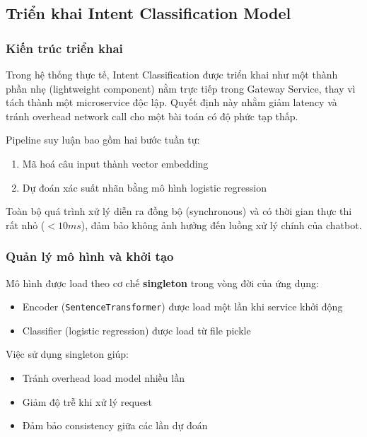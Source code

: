 \subsection{Triển khai Intent Classification Model}

\subsubsection{Kiến trúc triển khai}

Trong hệ thống thực tế, Intent Classification được triển khai như một thành phần nhẹ (lightweight component) nằm trực tiếp trong Gateway Service, thay vì tách thành một microservice độc lập. Quyết định này nhằm giảm latency và tránh overhead network call cho một bài toán có độ phức tạp thấp.

Pipeline suy luận bao gồm hai bước tuần tự:

\begin{enumerate}
    \item Mã hoá câu input thành vector embedding
    \item Dự đoán xác suất nhãn bằng mô hình logistic regression
\end{enumerate}

Toàn bộ quá trình xử lý diễn ra đồng bộ (synchronous) và có thời gian thực thi rất nhỏ ($<10ms$), đảm bảo không ảnh hưởng đến luồng xử lý chính của chatbot.

\subsubsection{Quản lý mô hình và khởi tạo}

Mô hình được load theo cơ chế \textbf{singleton} trong vòng đời của ứng dụng:

\begin{itemize}
    \item Encoder (\texttt{SentenceTransformer}) được load một lần khi service khởi động
    \item Classifier (logistic regression) được load từ file pickle
\end{itemize}

Việc sử dụng singleton giúp:

\begin{itemize}
    \item Tránh overhead load model nhiều lần
    \item Giảm độ trễ khi xử lý request
    \item Đảm bảo consistency giữa các lần dự đoán
\end{itemize}


